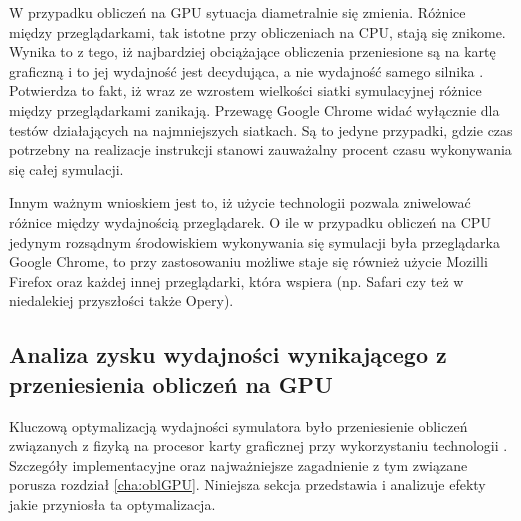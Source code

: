 W przypadku obliczeń na GPU sytuacja diametralnie się zmienia. Różnice między
przeglądarkami, tak istotne przy obliczeniach na CPU, stają się znikome.
Wynika to z tego, iż najbardziej obciążające obliczenia przeniesione są na
kartę graficzną i to jej wydajność jest decydująca, a nie wydajność samego
silnika .  Potwierdza to fakt, iż wraz ze wzrostem wielkości
siatki symulacyjnej różnice między przeglądarkami zanikają. Przewagę Google
Chrome widać wyłącznie dla testów działających na najmniejszych siatkach. Są
to jedyne przypadki, gdzie czas potrzebny na realizacje instrukcji \js
stanowi zauważalny procent czasu wykonywania się całej symulacji.

Innym ważnym wnioskiem jest to, iż użycie technologii  pozwala
zniwelować różnice między wydajnością przeglądarek. O ile w przypadku obliczeń
na CPU jedynym rozsądnym środowiskiem wykonywania się symulacji była
przeglądarka Google Chrome, to przy zastosowaniu  możliwe staje się
również użycie Mozilli Firefox oraz każdej innej przeglądarki, która wspiera
 (np. Safari czy też w niedalekiej przyszłości także Opery).

\subsection{Analiza zysku wydajności wynikającego z przeniesienia obliczeń na GPU}
\label{sec:analizaGPUCPU}

Kluczową optymalizacją wydajności symulatora \en było przeniesienie obliczeń
związanych z fizyką na procesor karty graficznej przy wykorzystaniu technologii
. Szczegóły implementacyjne oraz najważniejsze zagadnienie z tym
związane porusza rozdział \ref{cha:oblGPU}. Niniejsza sekcja przedstawia i
analizuje efekty jakie przyniosła ta optymalizacja.

